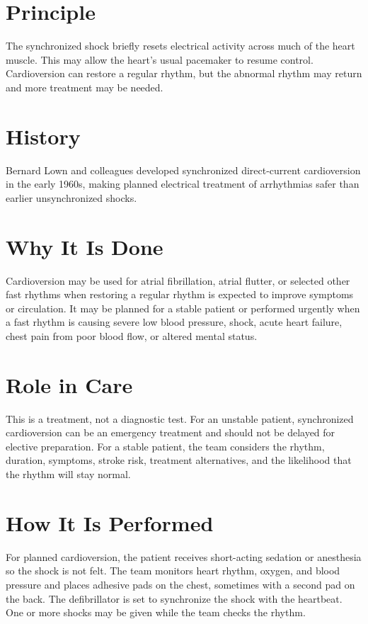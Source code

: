 \section*{Principle}
The synchronized shock briefly resets electrical activity across much of the heart muscle. This may allow the heart's usual pacemaker to resume control. Cardioversion can restore a regular rhythm, but the abnormal rhythm may return and more treatment may be needed.

\section*{History}
Bernard Lown and colleagues developed synchronized direct-current cardioversion in the early 1960s, making planned electrical treatment of arrhythmias safer than earlier unsynchronized shocks.

\section*{Why It Is Done}
Cardioversion may be used for atrial fibrillation, atrial flutter, or selected other fast rhythms when restoring a regular rhythm is expected to improve symptoms or circulation. It may be planned for a stable patient or performed urgently when a fast rhythm is causing severe low blood pressure, shock, acute heart failure, chest pain from poor blood flow, or altered mental status.

\section*{Role in Care}
This is a treatment, not a diagnostic test. For an unstable patient, synchronized cardioversion can be an emergency treatment and should not be delayed for elective preparation. For a stable patient, the team considers the rhythm, duration, symptoms, stroke risk, treatment alternatives, and the likelihood that the rhythm will stay normal.

\section*{How It Is Performed}
For planned cardioversion, the patient receives short-acting sedation or anesthesia so the shock is not felt. The team monitors heart rhythm, oxygen, and blood pressure and places adhesive pads on the chest, sometimes with a second pad on the back. The defibrillator is set to synchronize the shock with the heartbeat. One or more shocks may be given while the team checks the rhythm.

